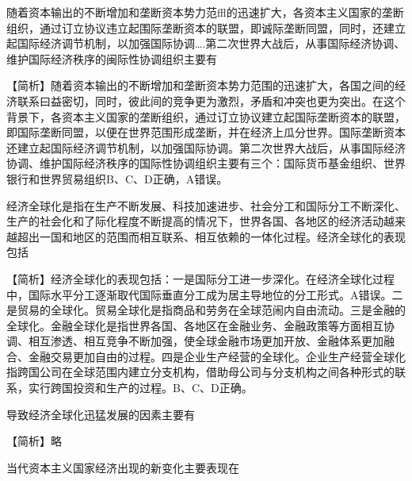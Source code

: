 \question 随着资本输出的不断增加和垄断资本势力范ffl的迅速扩大，各资本主义国家的垄断组织，通过订立协议违立起围际垄断资本的联盟，即诚际垄断同盟，同时，还建立起国际经济调节机制，以加强国际协调\ldots{}.第二次世界大战后，从事国际经济协调、维护国际经济秩序的闽际性协调组织主要有
\par{}
\begin{solution}【简析】随着资本输出的不断增加和垄断资本势力范围的迅速扩大，各国之间的经济联系曰益密切，同时，彼此间的竞争更为激烈，矛盾和冲突也更为突出。在这个背景下，各资本主义国家的垄断组织，通过订立协议建立起国际垄断资本的联盟，即国际垄断同盟，以便在世界范围形成垄断，并在经济上瓜分世界。国际垄断资本还建立起国际经济调节机制，以加强国际协调。第二次世界大战后，从事国际经济协调、维护国际经济秩序的国际性协调组织主要有三个：国际货币基金组织、世界银行和世界贸易组织B、C、D正确，A错误。
\end{solution}
\question 经济全球化是指在生产不断发展、科技加速进步、社会分工和国际分工不断深化、生产的社会化和了际化程度不断提高的情况下，世界各国、各地区的经济活动越来越超出一国和地区的范围而相互联系、相互依赖的一体化过程。经济全球化的表现包括
\par{}
\begin{solution}【简析】经济全球化的表现包括：一是国际分工进一步深化。在经济全球化过程中，国际水平分工逐渐取代国际垂直分工成为居主导地位的分工形式。A错误。二是贸易的全球化。贸易全球化是指商品和劳务在全球范闹内自由流动。三是金融的全球化。金融全球化是指世界各国、各地区在金融业务、金融政策等方面相互协调、相互渗透、相互竞争不断加强，使全球金融市场更加开放、金融体系更加融合、金融交易更加自由的过程。四是企业生产经营的全球化。企业生产经营全球化指跨国公司在全球范围内建立分支机构，借助母公司与分支机构之间各种形式的联系，实行跨国投资和生产的过程。B、C、D正确。
\end{solution}
\question 导致经济全球化迅猛发展的因素主要有
\par{}
\begin{solution}【简析】略
\end{solution}
\question 当代资本主义国家经济出现的新变化主要表现在
\par{}
